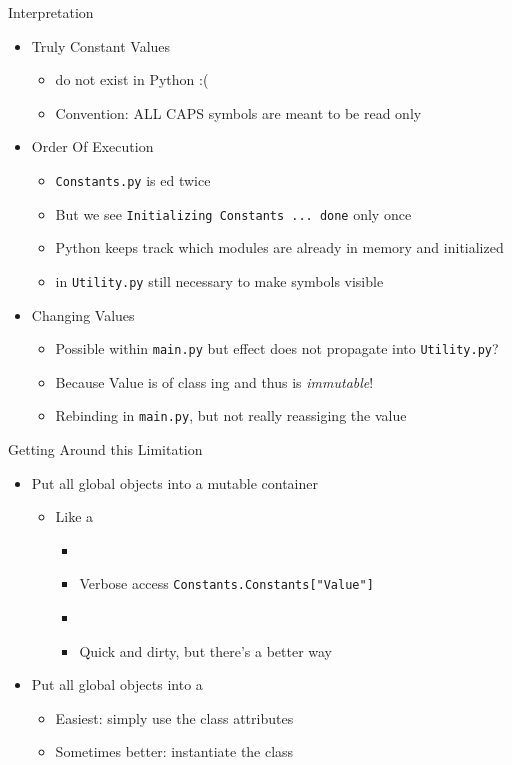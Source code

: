 \begin{frame}{Interpretation}
%
\begin{itemize}
\item Truly Constant Values
	\begin{itemize}
	\item do not exist in Python :(
	\item Convention: ALL CAPS symbols are meant to be read only
	\end{itemize}
\item Order Of Execution
	\begin{itemize}
	\item \texttt{Constants.py} is ed twice
	\item But we see \texttt{Initializing Constants ... done} only once
	\item[\Thus] Python keeps track which modules are already in memory and initialized
	\item[\Thus]  in \texttt{Utility.py} still necessary to make symbols visible
	\end{itemize}
\item Changing Values
	\begin{itemize}
	\item Possible within \texttt{main.py} but effect does not propagate into \texttt{Utility.py}?
	\item Because Value is of class ing and thus is \emph{immutable}!
	\item[\Thus] Rebinding in \texttt{main.py}, but not really reassiging the value
	\end{itemize}
\end{itemize}
%
\end{frame}


\begin{frame}{Getting Around this Limitation}
%
\begin{itemize}
\item Put all global objects into a mutable container
	\begin{itemize}
	\item Like a 
		\begin{itemize}
		\item {}
		\item Verbose access \texttt{Constants.Constants["Value"]}
		\item[\Thus]  
		\item Quick and dirty, but there's a better way
		\end{itemize}
	\end{itemize}
\item Put all global objects into a 
	\begin{itemize}
	\item Easiest: simply use the class attributes
	\item Sometimes better: instantiate the class
	\end{itemize}
\end{itemize}
%
\end{frame}

